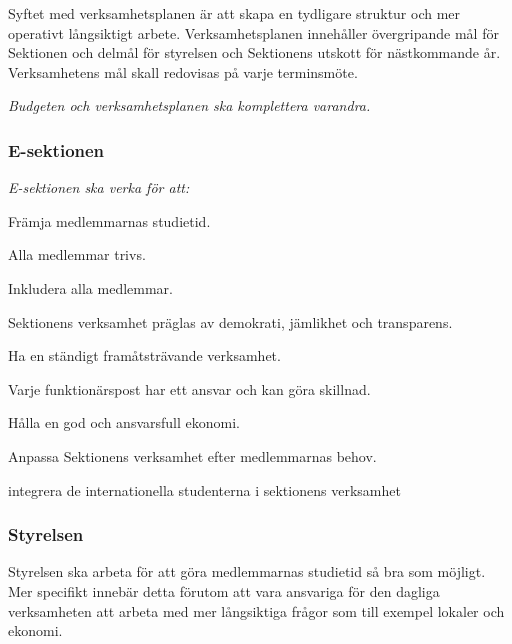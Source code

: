 \documentclass[../_main/handlingar.tex]{subfiles}
\begin{document}
Syftet med verksamhetsplanen är att skapa en tydligare struktur och mer operativt långsiktigt arbete. Verksamhetsplanen innehåller övergripande mål för Sektionen och delmål för styrelsen och Sektionens utskott för nästkommande år. Verksamhetens mål skall redovisas på varje terminsmöte.

\emph{Budgeten och verksamhetsplanen ska komplettera varandra.}

\subsubsection*{E-sektionen}
\emph{E-sektionen ska verka för att:}
\begin{dashlist}
    \item Främja medlemmarnas studietid. 
    \item Alla medlemmar trivs.
    \item Inkludera alla medlemmar. 
    \item Sektionens verksamhet präglas av demokrati, jämlikhet och transparens.
    \item Ha en ständigt framåtsträvande verksamhet. 
    \item Varje funktionärspost har ett ansvar och kan göra skillnad. 
    \item Hålla en god och ansvarsfull ekonomi. 
    \item Anpassa Sektionens verksamhet efter medlemmarnas behov.
    \item integrera de internationella studenterna i sektionens verksamhet
\end{dashlist}

\subsubsection*{Styrelsen}
Styrelsen ska arbeta för att göra medlemmarnas studietid så bra som möjligt. Mer specifikt innebär detta förutom att vara ansvariga för den dagliga verksamheten att arbeta med mer långsiktiga frågor som till exempel lokaler och ekonomi. 
\end{document}
